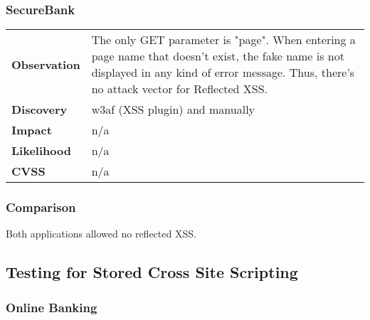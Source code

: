 \subsubsection*{SecureBank}

\begin{tabular}{l|p{10cm}}
\textbf{Observation} & The only GET parameter is "page". When entering a page name that doesn't exist, the fake name is not displayed in any kind of error message. Thus, there's no attack vector for Reflected XSS. \\
\textbf{Discovery} & w3af (XSS plugin) and manually \\
\textbf{Impact} & n/a \\
\textbf{Likelihood} & n/a \\
\textbf{CVSS} & n/a \\
\end{tabular}

\subsubsection*{Comparison}
Both applications allowed no reflected XSS.

\clearpage


\subsection{Testing for Stored Cross Site Scripting}

\subsubsection*{Online Banking}

